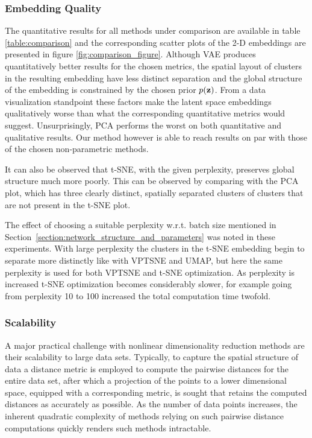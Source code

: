 \subsubsection{Embedding Quality}
\label{subsubsection:embedding_quality}

The quantitative results for all methods under comparison are available in table \ref{table:comparison} and the corresponding scatter plots of the 2-D embeddings are presented in figure \ref{fig:comparison_figure}. Although VAE produces quantitatively better results for the chosen metrics, the spatial layout of clusters in the resulting embedding have less distinct separation and the global structure of the embedding is constrained by the chosen prior $p(\mathbf{z})$. From a data visualization standpoint these factors make the latent space embeddings qualitatively worse than what the corresponding quantitative metrics would suggest. Unsurprisingly, PCA performs the worst on both quantitative and qualitative results. Our method however is able to reach results on par with those of the chosen non-parametric methods.

It can also be observed that t-SNE, with the given perplexity, preserves global structure much more poorly. This can be observed by comparing with the PCA plot, which has three clearly distinct, spatially separated clusters of clusters that are not present in the t-SNE plot.

The effect of choosing a suitable perplexity w.r.t. batch size mentioned in Section~\ref{section:network_structure_and_parameters} was noted in these experiments. With large perplexity the clusters in the t-SNE embedding begin to separate more distinctly like with VPTSNE and UMAP, but here the same perplexity is used for both VPTSNE and t-SNE optimization. As perplexity is increased t-SNE optimization becomes considerably slower, for example going from perplexity 10 to 100 increased the total computation time twofold.

\subsubsection{Scalability}
\label{subsubsection:scalability}

A major practical challenge with nonlinear dimensionality reduction methods are their scalability to large data sets. Typically, to capture the spatial structure of data a distance metric is employed to compute the pairwise distances for the entire data set, after which a projection of the points to a lower dimensional space, equipped with a corresponding metric, is sought that retains the computed distances as accurately as possible. As the number of data points increases, the inherent quadratic complexity of methods relying on such pairwise distance computations quickly renders such methods intractable.

